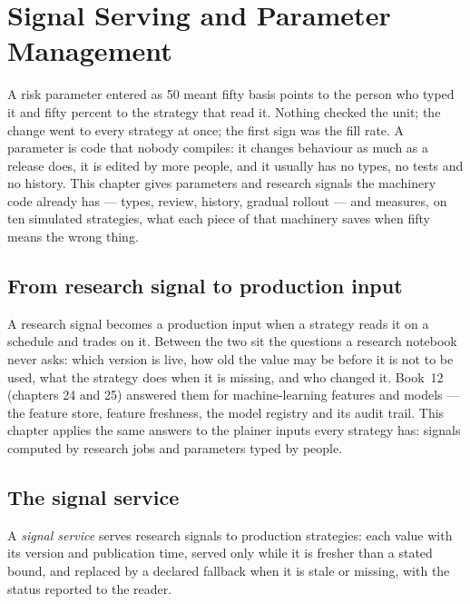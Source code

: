 \chapter{Signal Serving and Parameter Management}\label{ch:pl:signal-serving-and-parameter-management}

A risk parameter entered as 50 meant fifty basis points to the person who typed it and fifty percent to the strategy that read it. Nothing
checked the unit; the change went to every strategy at once; the first sign was the fill rate. A parameter is code that nobody compiles:
it changes behaviour as much as a release does, it is edited by more people, and it usually has no types, no tests and no history. This
chapter gives parameters and research signals the machinery code already has --- types, review, history, gradual rollout --- and measures,
on ten simulated strategies, what each piece of that machinery saves when fifty means the wrong thing.

\section{From research signal to production input}

A research signal becomes a production input when a strategy reads it on a schedule and trades on it. Between the two sit the questions a
research notebook never asks: which version is live, how old the value may be before it is not to be used, what the strategy does when it is
missing, and who changed it. Book~12 (chapters 24 and 25) answered them for machine-learning features and models --- the feature store,
feature freshness, the model registry and its audit trail. This chapter applies the same answers to the plainer inputs every strategy has:
signals computed by research jobs and parameters typed by people.

\section{The signal service}

\begin{definition}\label{def:pl:signal-serving-and-parameter-management:service}
A \emph{signal service} serves research signals to production strategies: each value with its version and publication
time, served only while it is fresher than a stated bound, and replaced by a declared fallback when it is stale or missing, with the status
reported to the reader.
\end{definition}

